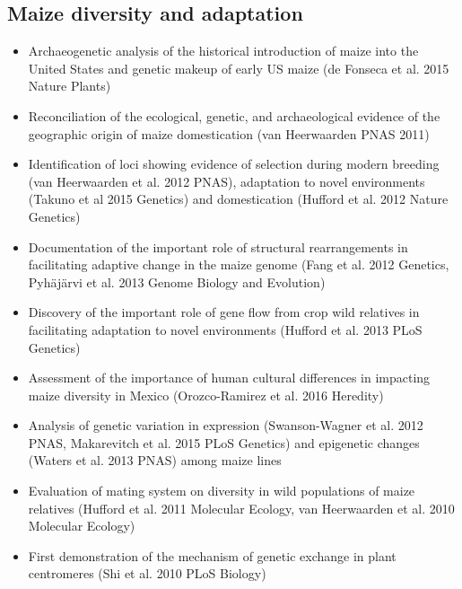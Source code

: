 \documentclass[]{article}
\begin{document}
\subsection*{Maize diversity and adaptation}
\begin{itemize}
\item Archaeogenetic analysis of the historical introduction of maize into the United States and genetic makeup of early US maize (de Fonseca et al. 2015 Nature Plants)
\item Reconciliation of the ecological, genetic, and archaeological evidence of the geographic origin of maize domestication (van Heerwaarden PNAS 2011)
\item Identification of loci showing evidence of selection during modern breeding (van Heerwaarden et al. 2012 PNAS), adaptation to novel environments (Takuno et al 2015 Genetics) and domestication (Hufford et al. 2012 Nature Genetics)
\item Documentation of the important role of structural rearrangements in facilitating adaptive change in the maize genome (Fang et al. 2012 Genetics, Pyh\"{a}j\"{a}rvi et al. 2013 Genome Biology and Evolution)
\item Discovery of the important role of gene flow from crop wild relatives in facilitating adaptation to novel environments (Hufford et al. 2013 PLoS Genetics)
\item Assessment of the importance of human cultural differences in impacting maize diversity in Mexico (Orozco-Ramirez et al. 2016 Heredity)
\item Analysis of genetic variation in expression (Swanson-Wagner et al. 2012 PNAS, Makarevitch et al. 2015 PLoS Genetics) and epigenetic changes (Waters et al. 2013 PNAS) among maize lines
\item Evaluation of mating system on diversity in wild populations of maize relatives (Hufford et al. 2011 Molecular Ecology, van Heerwaarden et al. 2010 Molecular Ecology)
\item First demonstration of the mechanism of genetic exchange in plant centromeres (Shi et al. 2010 PLoS Biology)
\end{itemize}
\end{document}
